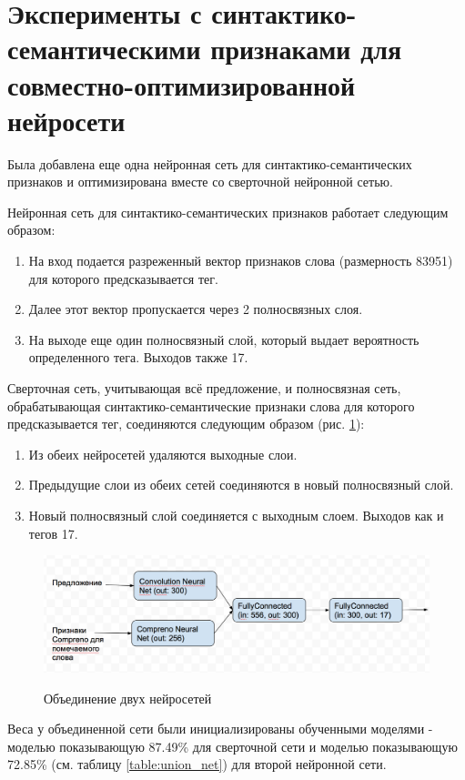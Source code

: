 \section{Эксперименты с синтактико-семантическими признаками для совместно-оптимизированной нейросети}

Была добавлена еще одна нейронная сеть для синтактико-семантических признаков и оптимизирована
вместе со сверточной нейронной сетью.

Нейронная сеть для синтактико-семантических признаков работает следующим образом:
\begin{enumerate}
  \item На вход подается разреженный вектор признаков слова (размерность 83951) для которого предсказывается тег.
  \item Далее этот вектор пропускается через 2 полносвязных слоя.
  \item На выходе еще один полносвязный слой, который выдает вероятность определенного тега.
  Выходов также 17.
\end{enumerate}

Сверточная сеть, учитывающая всё предложение, и полносвязная сеть, обрабатывающая
синтактико-семантические признаки слова для которого предсказывается тег, соединяются следующим
образом (рис. \ref{figure:union_net}):
\begin{enumerate}
  \item Из обеих нейросетей удаляются выходные слои.
  \item Предыдущие слои из обеих сетей соединяются в новый полносвязный слой.
  \item Новый полносвязный слой соединяется с выходным слоем. Выходов как и тегов 17.
\end{enumerate}

\begin{figure}[h]
  \caption{Объединение двух нейросетей}
  \includegraphics[scale=0.5]{two-net.png}
  \label{figure:union_net}
\end{figure}

Веса у объединенной сети были инициализированы обученными моделями -
моделью показывающую 87.49\% для сверточной сети и моделью показывающую
72.85\% (см. таблицу \ref{table:union_net}) для второй нейронной сети.

